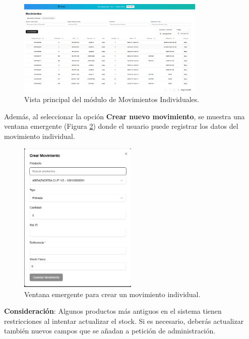 \begin{figure}[H]
    \centering
    \includegraphics[width=0.8\textwidth]{imgs/Almacen_General/movimientos/movimientos_individuales/movimientos_indiv.png}
    \caption{Vista principal del módulo de Movimientos Individuales.}
    \label{fig:movimientos_ind1}
\end{figure}

Además, al seleccionar la opción \textbf{Crear nuevo movimiento}, se muestra una ventana emergente (Figura \ref{fig:movimientos_ind2}) donde el usuario puede registrar los datos del movimiento individual.

\begin{figure}[H]
    \centering
    \includegraphics[width=0.5\textwidth]{imgs/Almacen_General/movimientos/movimientos_individuales/crear_movimiento.png}
    \caption{Ventana emergente para crear un movimiento individual.}
    \label{fig:movimientos_ind2}
\end{figure}

\begin{justify}
    
    \textbf{Consideración}: Algunos productos más antiguos en el sistema tienen restricciones al intentar actualizar el stock. Si es necesario, deberás actualizar también nuevos campos que se añadan a petición de administración. 
\end{justify}

